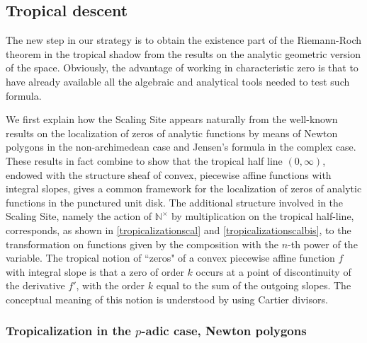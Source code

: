 \documentclass[graybox, envcountsect%
]{svmult}
\def\N{{\mathbb N}}
\def\no{\noindent}
\def\nt{\N^{\times}}
\begin{document}
\subsection{Tropical descent}\label{subsec:3.2}

The new step in our strategy is to obtain the existence part of the Riemann-Roch theorem in the tropical shadow   from the results on the analytic  geometric version of the space.
 Obviously, the advantage of working in characteristic zero is that to have already available all the algebraic and analytical tools needed to test such formula. 

\no We first explain how the Scaling Site appears naturally from the well-known results on the localization of zeros of analytic functions by means of Newton polygons in the non-archimedean case and Jensen's formula in the complex case. These results in fact combine to show that the tropical half line   $(0,\infty)$, endowed with the structure sheaf of convex,  piecewise affine functions with integral slopes, gives a  common framework for the localization of zeros of analytic functions in the  punctured unit disk. The additional structure involved in the Scaling Site, namely the action of $\nt$ by multiplication on the tropical half-line, corresponds, as shown in \eqref{tropicalizationscal} and \eqref{tropicalizationscalbis}, to the transformation on functions given by the composition with the $n$-th power of the variable.
  The tropical notion of ``zeros" of a convex  piecewise affine function $f$ with integral slope is that a zero of order $k$ occurs at a point of discontinuity of the derivative $f'$, with the order $k$ equal to the sum of the outgoing slopes. The conceptual meaning of this notion is understood  by using Cartier divisors.



\subsubsection{Tropicalization in the $p$-adic case, Newton polygons}\label{subsubsec:3.2.1}
\end{document}
